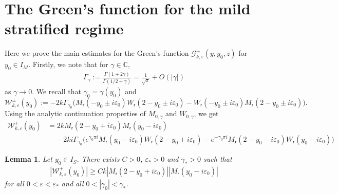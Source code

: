 \documentclass[11pt,reqno]{amsproc}
\newtheorem{lemma}[proposition]{Lemma}
\theoremstyle{definition}
\numberwithin{equation}{section}
\newcommand{\C}{{\mathbb C}}
\newcommand{\G}{{\mathcal{G}}}
\newcommand{\sr}{{\mathsf{r}}}
\newcommand{\W}{{\mathcal{W}}}
\newcommand{\ep}{\varepsilon}
\begin{document}
\section{The Green's function for the mild stratified regime}
Here we prove the main estimates for the Green's function $\G_{k,\ep}^\pm(y,y_0,z)$ for $y_0\in I_M$.
Firstly, we note that for $\gamma\in \C$, 
\begin{align*}
\Gamma_\gamma := \frac{\Gamma(1+2\gamma)}{\Gamma(1/2+\gamma)} = \frac{1}{\sqrt\pi} + O(|\gamma|)
\end{align*}
as $\gamma\rightarrow 0$. We recall that $\gamma_0=\gamma(y_0)$ and 
\begin{equation*}
\W_{k,\ep}^\pm(y_0):= -2k\Gamma_{\gamma_0} \Big( M_{\sr}( - y_0\pm i\ep_0)W_{\sr}(2- y_0\pm i\ep_0) - W_{\sr}( - y_0\pm i\ep_0)M_{\sr}(2-y_0\pm i\ep_0) \Big).
\end{equation*} 
Using the analytic continuation properties of $M_{0,\gamma}$ and $W_{0,\gamma}$, we get
\begin{align*}
\W_{k,\ep}^+(y_0) &= 2k M_{\sr}(2-y_0+i\ep_0) M_{\sr}(y_0-i\ep_0)\\
&\quad-2ki \Gamma_{\gamma_0}\Big( e^{{\gamma_0}\pi i} M_{\sr}( y_0- i\ep_0)W_{\sr}(2-y_0+ i\ep_0) - e^{-{\gamma_0}\pi i} M_{\sr}(  2 -y_0 - i\ep_0)W_{\sr}(y_0- i\ep_0) \Big) 
\end{align*}

\begin{lemma}\label{lemma:Wronskianlowerboundmildstrat}
Let $y_0\in I_S$. There exists $C>0$, $\ep_*>0$ and $\gamma_*>0$ such that 
\begin{align*}
|\W_{k,\ep}^+(y_0)| \geq Ck  |M_{\sr}(2-y_0+i\ep_0)||M_{\sr}(y_0-i\ep_0)|
\end{align*}
for all $0<\ep<\ep_*$ and all $0<|{\gamma_0}|<\gamma_*$.
\end{lemma}
\end{document}
